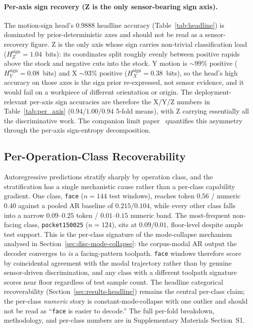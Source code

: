 \documentclass[sensors,article,submit,moreauthors,pdftex]{Definitions/mdpi}
\begin{document}
\paragraph{Per-axis sign recovery (Z is the only sensor-bearing sign axis).} The motion-sign head's $0.9888$ headline accuracy (Table~\ref{tab:headline}) is dominated by prior-deterministic axes and should not be read as a sensor-recovery figure. Z is the only axis whose sign carries non-trivial classification load ($H_{Z}^{\text{sign}}\!=\!1.04$~bits): its coordinates split roughly evenly between positive rapids above the stock and negative cuts into the stock. Y motion is $\sim\!99\%$ positive ($H_{Y}^{\text{sign}}\!=\!0.08$~bits) and X $\sim\!93\%$ positive ($H_{X}^{\text{sign}}\!=\!0.38$~bits), so the head's high accuracy on those axes is the sign prior re-expressed, not sensor evidence, and it would fail on a workpiece of different orientation or origin. The deployment-relevant per-axis sign accuracies are therefore the X/Y/Z numbers in Table~\ref{tab:per_axis} ($0.94$/$1.00$/$0.94$ 5-fold means), with Z carrying essentially all the discriminative work. The companion limit paper~\cite{paperB_entropy} quantifies this asymmetry through the per-axis sign-entropy decomposition.


\subsection{Per-Operation-Class Recoverability}
\label{sec:per-op-class}

Autoregressive predictions stratify sharply by operation class, and the stratification has a single mechanistic cause rather than a per-class capability gradient. One class, \texttt{face} ($n=144$ test windows), reaches token $0.56$ / numeric $0.40$ against a pooled AR baseline of $0.215 / 0.104$, while every other class falls into a narrow $0.09$--$0.25$ token / $0.01$--$0.15$ numeric band. The most-frequent non-facing class, \texttt{pocket150025} ($n=124$), sits at $0.09 / 0.01$, floor-level despite ample test support. This is the per-class signature of the mode-collapse mechanism analysed in Section~\ref{sec:disc-mode-collapse}: the corpus-modal AR output the decoder converges to \emph{is} a facing-pattern toolpath. \texttt{face} windows therefore score by coincidental agreement with the modal trajectory rather than by genuine sensor-driven discrimination, and any class with a different toolpath signature scores near floor regardless of test sample count. The headline categorical recoverability (Section~\ref{sec:results-headline}) remains the central per-class claim; the per-class \emph{numeric} story is constant-mode-collapse with one outlier and should not be read as ``\texttt{face} is easier to decode.'' The full per-fold breakdown, methodology, and per-class numbers are in Supplementary Materials Section~S1.
\end{document}
